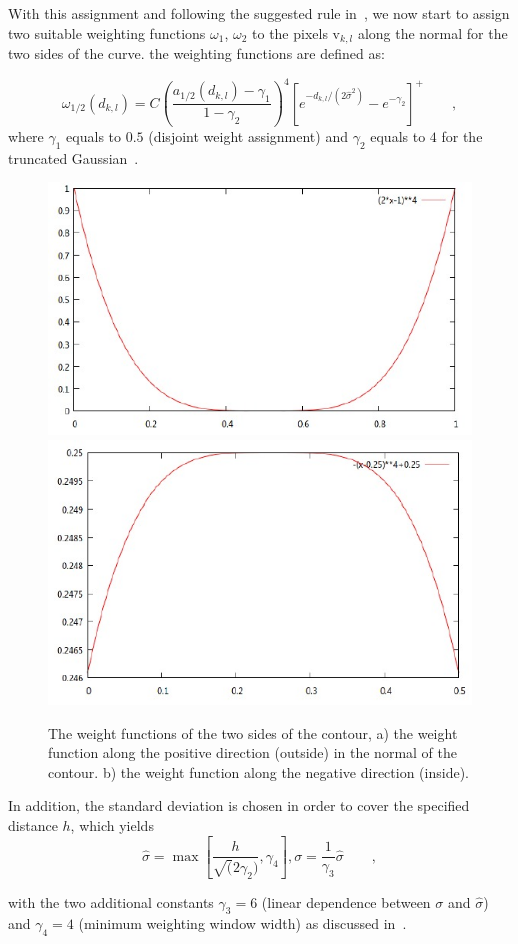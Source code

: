 \documentclass[conference]{IEEEtran}
\begin{document}
With this assignment and following the suggested rule in~\cite{hanek2004contracting}, we now start to assign two suitable weighting functions
$\omega_1$, $\omega_2$ to the pixels $\mathrm{v}_{k,l}$ along the
normal for the two sides of the curve. the weighting functions are
defined as:

\begin{equation}
  \label{eq:weight}
  \omega_{1/2}(d_{k,l}) = C\left(\frac{a_{1/2}(d_{k,l}) -
    \gamma_1}{1-\gamma_2}\right)^4 \left[e^{-d_{k,l}/(2\hat{\sigma}^2)} - e^{-\gamma_2}\right]^+\qquad,
\end{equation}
where $\gamma_1$ equals to $0.5$ (disjoint weight assignment) and $\gamma_2$
equals to $4$ for the truncated Gaussian~\cite{hanek2004contracting}. 

\begin{figure} 
\includegraphics[width=0.48\columnwidth]{images/weight1.jpg}
\includegraphics[width=0.48\columnwidth]{images/weight2.jpg}
\caption{The weight functions of the two sides of the contour, a) the
  weight function along the positive direction (outside) in the normal of the
  contour. b) the weight function along the negative direction (inside). }
\label{fig:weight}
\end{figure}

In addition, the standard
deviation is chosen in order to cover the specified distance $h$,
which yields 
\begin{equation}
  \label{eq:deviation}
  \hat{\sigma} = \max \left[\frac{h}{\sqrt(2\gamma_2)}, \gamma_4
  \right], \sigma  = \frac{1}{\gamma_3} \hat{\sigma}\qquad,
\end{equation}

with the two additional constants $\gamma_3 = 6$ (linear dependence
between $\sigma$ and $\hat{\sigma}$) and $\gamma_4 = 4$ (minimum
weighting window width) as discussed in~\cite{panin2006efficient}. 
\end{document}
